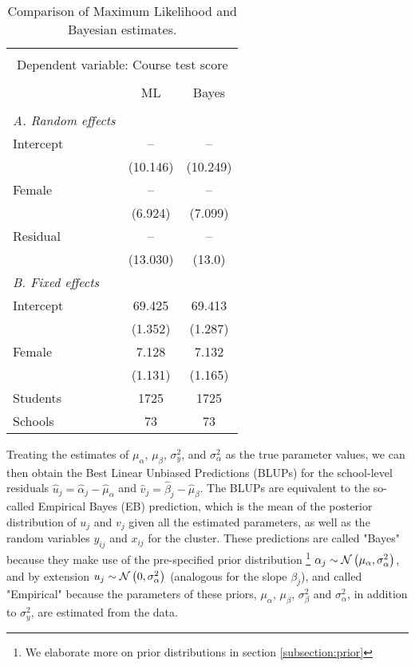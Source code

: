 \begin{table}[H]
	\centering
	\caption{{\small Comparison of Maximum Likelihood and Bayesian estimates.}}
	\label{}
	
	\smallskip
	\begin{tabular}{l*{2}{c}}
		\toprule \\[-1.0em]
		\multicolumn{3}{c}{Dependent variable: Course test score}\\ \\[-1.0em]
		&ML &Bayes\\
		\midrule \\[-1.0em]
		\emph{A. Random effects}\\
		Intercept & -- & --\\
		& (10.146) & (10.249)\\
		Female & -- & --\\
		& (6.924) & (7.099)\\
		Residual & -- & --\\
		& (13.030) & (13.0)\\
		\emph{B. Fixed effects} \\
		Intercept & 69.425 & 69.413\\
		& (1.352) & (1.287)\\
		Female & 7.128 & 7.132\\
		& (1.131) & (1.165)\\
		\hline
		Students&1725&1725\\
		Schools&73&73\\
		\bottomrule
		
	\end{tabular}
	\label{tab:results}
\end{table}
Treating the estimates of $\mu_\alpha$, $\mu_\beta$, $\sigma^2_{y}$, and $\sigma^2_{\alpha}$ as the true parameter values, we can then obtain the Best Linear Unbiased Predictions (BLUPs) for the school-level residuals $\hat{u}_j = \hat{\alpha}_{j} - \hat{\mu}_{\alpha}$ and $\hat{v}_j = \hat{\beta}_{j} - \hat{\mu}_{\beta}$. The BLUPs are equivalent to the so-called Empirical Bayes (EB) prediction, which is the mean of the posterior distribution of $u_{j}$ and $v_{j}$ given all the estimated parameters, as well as the random variables $y_{ij}$ and $x_{ij}$ for the cluster.  These predictions are called "Bayes" because they make use of the pre-specified prior distribution \footnote{We elaborate more on prior distributions in section \ref{subsection:prior} } $\alpha_j \sim \mathcal{N}\left(\mu_\alpha, \sigma^2_\alpha\right)$, and by extension $u_j \sim \mathcal{N}\left(0, \sigma^2_\alpha\right)$ (analogous for the slope $\beta_j$), and called "Empirical" because the parameters of these priors, $\mu_\alpha$, $\mu_\beta$,  $\sigma^2_{\beta}$ and $\sigma^2_{\alpha}$, in addition to $\sigma^2_{y}$, are estimated from the data.

